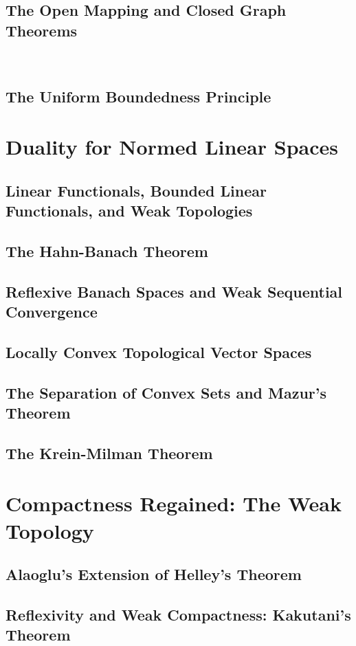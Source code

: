 \documentclass[a4paper,10pt]{book}
\theoremstyle{plain} %
\begin{document}
\section{The Open Mapping and Closed Graph Theorems}\
\section{The Uniform Boundedness Principle}

\chapter{Duality for Normed Linear Spaces}

\section{Linear Functionals, Bounded Linear Functionals, and Weak Topologies}
\section{The Hahn-Banach Theorem}
\section{Reflexive Banach Spaces and Weak Sequential Convergence}
\section{Locally Convex Topological Vector Spaces}
\section{The Separation of Convex Sets and Mazur's Theorem}
\section{The Krein-Milman Theorem}

\chapter{Compactness Regained: The Weak Topology}

\section{Alaoglu's Extension of Helley's Theorem}
\section{Reflexivity and Weak Compactness: Kakutani's Theorem}
\end{document}
